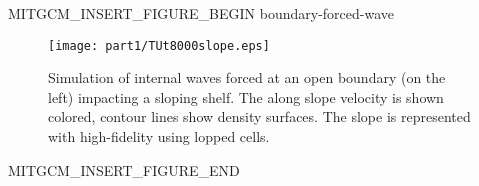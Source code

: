 \begin{rawhtml}MITGCM_INSERT_FIGURE_BEGIN boundary-forced-wave\end{rawhtml}
\begin{figure}
\begin{center}
  \texttt{[image: part1/TUt8000slope.eps]}
\end{center}
\caption{Simulation of internal waves forced at an open boundary (on the left)
impacting a sloping shelf. The along slope velocity is shown colored, contour
lines show density surfaces. The slope is represented with high-fidelity using
lopped cells.}
\label{fig:boundary-forced-wave}
\end{figure}
\begin{rawhtml}MITGCM_INSERT_FIGURE_END\end{rawhtml}
